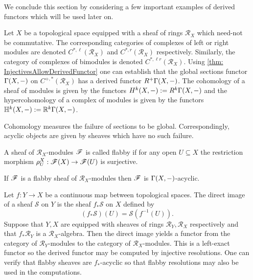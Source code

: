 We conclude this section by considering a few important examples of derived functors which will be used later on.

Let $X$ be a topological space equipped with a sheaf of rings $\mathcal{R}_X$ which need-not be commutative.
The corresponding categories of complexes of left or right modules are denoted $C^{*,\ell}(\mathcal{R}_X)$ and $C^{*,r}(\mathcal{R}_X)$ respectively.
Similarly, the category of complexes of bimodules is denoted $C^{*,\ell r}(\mathcal{R}_X)$.
Using \cref{thm: InjectivesAllowDerivedFunctor} one can establish that the global sections functor $\Gamma(X,{-})$ on $C^{+,*}(\mathcal{R}_X)$ has a derived functor $R^+\Gamma(X,{-})$.
The cohomology of a sheaf of modules is given by the functors $H^k(X,{-}) := R^k \Gamma(X,{-})$ and the hypercohomology of a complex of modules is given by the functors $\mathbb{H}^k(X,{-}):= \mathbb{R}^k\Gamma(X,{-})$.

Cohomology measures the failure of sections to be global.
Correspondingly, acyclic objects are given by sheaves which have no such failure.
\begin{definition}
 A sheaf of $\mathcal{R}_X$-modules $\mathscr{F}$ is called flabby if for any open $U\subseteq X$ the restriction morphism $\rho_U^X:\mathscr{F}(X)\to\mathscr{F}(U) $ is surjective.
\end{definition}
\begin{proposition}{\cite[Chapter 2]{dimca2004sheaves}}
 If $\mathscr{F}$ is a flabby sheaf of $\mathcal{R}_X$-modules then $\mathscr{F}$ is $\Gamma(X,{-})$-acyclic.
\end{proposition}

Let $f:Y\to X$ be a continuous map between topological spaces.
The direct image of a sheaf $\mathcal{S}$ on $Y$ is the sheaf $f_*\mathcal{S}$ on $X$ defined by
$$(f_*\mathcal{S})(U) = \mathcal{S}(f^{-1}(U)). $$
Suppose that $Y,X$ are equipped with sheaves of rings $\mathcal{R}_Y, \mathcal{R}_X$ respectively and that $f_*\mathcal{R}_Y$ is a $\mathcal{R}_X$-algebra.
Then the direct image yields a functor from the category of $\mathcal{R}_Y$-modules to the category of $\mathcal{R}_X$-modules.
This is a left-exact functor so the derived functor may be computed by injective resolutions.
One can verify that flabby sheaves are $f_*$-acyclic so that flabby resolutions may also be used in the computations.

